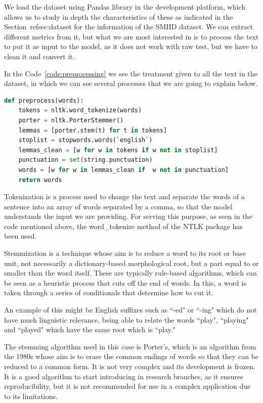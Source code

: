 We load the dataset using Pandas library in the development platform, which allows us to study in depth the characteristics of these as indicated in the Section~ref{sec:dataset} for the information of the SMHD dataset. We can extract different metrics from it, but what we are most interested in is to process the text to put it as input to the model, as it does not work with raw test, but we have to clean it and convert it.

In the Code~\ref{code:preprocessing} we see the treatment given to all the text in the dataset, in which we can see several processes that we are going to explain below.

\begin{lstlisting}[language=Python, caption={Preprocessing function for our data}, label={code:preprocessing}]
def preprocess(words):
    tokens = nltk.word_tokenize(words)
    porter = nltk.PorterStemmer()
    lemmas = [porter.stem(t) for t in tokens]
    stoplist = stopwords.words(`english`)
    lemmas_clean = [w for w in tokens if w not in stoplist]
    punctuation = set(string.punctuation)
    words = [w for w in lemmas_clean if  w not in punctuation]
    return words
\end{lstlisting}

Tokenization is a process used to change the text and separate the words of a sentence into an array of words separated by a comma, so that the model understands the input we are providing. For serving this purpose, as seen in the code mentioned above, the word\_tokenize method of the NTLK package has been used.

Stemmization is a technique whose aim is to reduce a word to its root or base unit, not necessarily a dictionary-based morphological root, but a part equal to or smaller than the word itself. These are typically rule-based algorithms, which can be seen as a heuristic process that cuts off the end of words. In this, a word is taken through a series of conditionals that determine how to cut it.

An example of this might be English suffixes such as ``-ed" or ``-ing" which do not have much linguistic relevance, being able to relate the words ``play", ``playing" and ``played" which have the same root which is ``play."

The stemming algorithm used in this case is Porter's, which is an algorithm from the 1980s whose aim is to erase the common endings of words so that they can be reduced to a common form. It is not very complex and its development is frozen. It is a good algorithm to start introducing in research branches, as it ensures reproducibility, but it is not recommended for use in a complex application due to its limitations.

